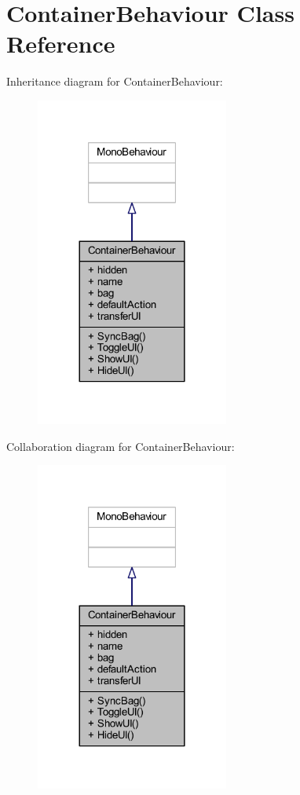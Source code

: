 \hypertarget{class_container_behaviour}{}\section{Container\+Behaviour Class Reference}
\label{class_container_behaviour}


Inheritance diagram for Container\+Behaviour\+:
\nopagebreak
\begin{figure}[H]
\begin{center}
\leavevmode
\includegraphics[width=180pt]{class_container_behaviour__inherit__graph}
\end{center}
\end{figure}


Collaboration diagram for Container\+Behaviour\+:
\nopagebreak
\begin{figure}[H]
\begin{center}
\leavevmode
\includegraphics[width=180pt]{class_container_behaviour__coll__graph}
\end{center}
\end{figure}
